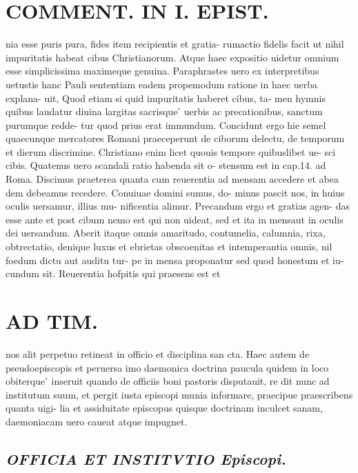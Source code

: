 \documentclass{article}
\begin{document}
\begin{pages}
\section*{COMMENT. IN I. EPIST. }\pstart nia esse puris pura, fides item recipientis et gratia- rumactio fidelis facit ut nihil impuritatis habeat cibus Christianorum. Atque haec expositio uidetur omnium esse simplicissima maximeque genuina. Paraphrastes uero ex interpretibus uetustis hanc Pauli sententiam eadem propemodum ratione in haec uerba explana- uit, Quod etiam si quid impuritatis haberet cibus, ta- men hymnis quibus laudatur diuina largitas sacrisque ́ uerbis ac precationibus, sanctum purumque redde- tur quod prius erat immundum. Concidunt ergo hie semel quaecunque mercatores Romani praeceperunt de ciborum delectu, de temporum et dierum discrimine. Christiano enim licet quouis tempore quibuslibet ue- sci cibis. Quatenus uero scandali ratio habenda sit o- stensum est in cap.14. ad Roma. Discimus praeterea quanta cum reuerentia ad mensam accedere et abea dem debeamus recedere. Conuiuae domini sumus, do- minus pascit nos, in huius oculis uersamur, illius mu- nificentia alimur. Precandum ergo et gratias agen- das esse ante et post cibum nemo est qui non uideat, sed et ita in mensaut in oculis dei uersandum. Aberit itaque omnis amaritudo, contumelia, calumnia, rixa, obtrectatio, denique luxus et ebrietas obscoenitas et intemperantia omnis, nil foedum dictu aut auditu tur- pe in mensa proponatur sed quod honestum et iu- cundum sit. Reuerentia hofpitis qui praesens est et  \pend
\section*{AD TIM. }
\marginpar{[ p.141 ]}\pstart nos alit perpetuo retineat in officio et disciplina san cta. Haec autem de pseudoepiscopis et peruersa imo daemonica doctrina paucula quidem in loco obiterque ́ inseruit quando de officiis boni pastoris disputauit, re dit nunc ad institutum suum, et pergit iusta episcopi munia informare, praecipue praescribens quanta uigi- lia et assiduitate episcopus quisque doctrinam inculcet sanam, daemoniacam uero caueat atque impugnet.  \pend
{}
{}
\subsection*{\textit{OFFICIA ET INSTITVTIO Episcopi. }}
{}

\end{pages}
\end{document}

